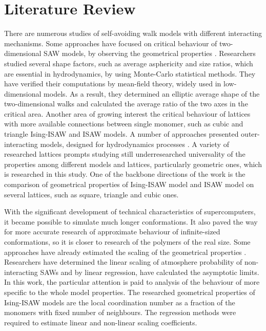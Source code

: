 
\section{Literature Review}

There are numerous studies of self-avoiding walk models with different interacting mechanisms. 
Some approaches have focused on critical behaviour of two-dimensional SAW models, by observing the geometrical properties \cite{Caracciolo2011, owczarek2000first, arkin2013gyration}. 
Researchers studied several shape factors, such as average asphericity and size ratios, which are essential in hydrodynamics, by using Monte-Carlo statistical methods. 
They have verified their computations by mean-field theory, widely used in low-dimensional models. 
As a result, they determined an elliptic average shape of the two-dimensional walks and calculated the average ratio of the two axes in the critical area.
Another area of growing interest the critical behaviour of lattices with more available connections between single monomer, such as cubic and triangle Ising-ISAW \cite{Foster2021} and ISAW \cite{Tesi1996, Privman1986} models. 
A number of approaches presented outer-interacting models, designed for hydrodynamics processes \cite{LivneSAW1988, madras1988pivot}. 
A variety of researched lattices prompts studying still underresearched universality of the properties among different models and lattices, particularly geometric ones, which is researched in this study. 
One of the backbone directions of the work is the comparison of geometrical properties of Ising-ISAW model and ISAW model on several lattices, such as square, triangle and cubic ones.

With the significant development of technical characteristics of supercomputers, it became possible to simulate much longer conformations. 
It also paved the way for more accurate research of approximate behaviour of infinite-sized conformations, so it is closer to research of the polymers of the real size. 
Some approaches have already estimated the scaling of the geometrical properties \cite{owczarek2008scaling}. 
Researchers have determined the linear scaling of atmosphere probability of non-interacting SAWs and by linear regression, have calculated the asymptotic limits. 
In this work, the particular attention is paid to analysis of the behaviour of more specific to the whole model properties. 
The researched geometrical properties of Ising-ISAW models are the local coordination number as a fraction of the monomers with fixed number of neighbours. 
The regression methods were required to estimate linear and non-linear scaling coefficients.
